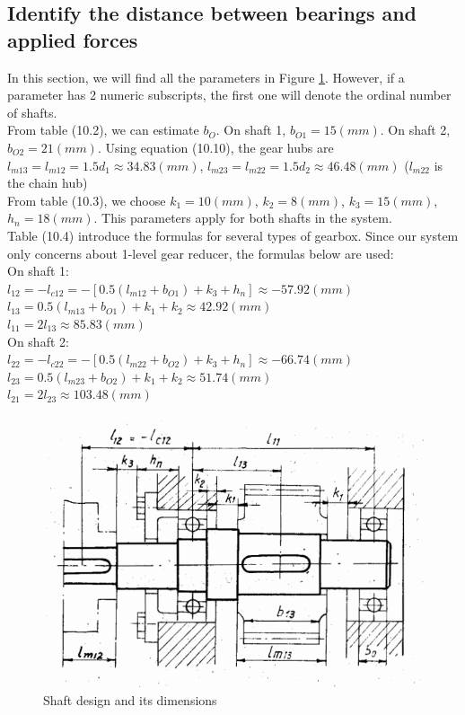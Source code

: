 \subsection{Identify the distance between bearings and applied forces}
In this section, we will find all the parameters in Figure \ref{shaft}. However, if a parameter has 2 numeric subscripts, the first one will denote the ordinal number of shafts.\\
From table (10.2), we can estimate $ b_O $. On shaft 1, $ b_{O1} = 15\unit{(mm)} $. On shaft 2, $ b_{O2} = 21\unit{(mm)} $. Using equation (10.10), the gear hubs are $ l_{m13} = l_{m12} = 1.5d_1 \approx  34.83\unit{(mm)} $, $ l_{m23} = l_{m22} = 1.5d_2 \approx 46.48\unit{(mm)} $ ($ l_{m22} $ is the chain hub)\\
From table (10.3), we choose $ k_1=10\unit{(mm)}$, $ k_2=8\unit{(mm)} $, $ k_3=15\unit{(mm)} $, $ h_n=18\unit{(mm)} $. This parameters apply for both shafts in the system.\\
Table (10.4) introduce the formulas for several types of gearbox. Since our system only concerns about 1-level gear reducer, the formulas below are used:\\
On shaft 1:\\
$ l_{12} = -l_{c12} = -\left[ 0.5(l_{m12}+b_{O1})+k_3+h_n  \right] \approx -57.92\unit{(mm)} $\\
$ l_{13} = 0.5(l_{m13}+b_{O1})+k_1+k_2 \approx 42.92\unit{(mm)} $\\
$ l_{11} = 2l_{13} \approx 85.83\unit{(mm)}$\\
On shaft 2:\\
$ l_{22} = -l_{c22} = -\left[ 0.5(l_{m22}+b_{O2})+k_3+h_n \right] \approx -66.74\unit{(mm)} $\\
$ l_{23} = 0.5(l_{m23}+b_{O2})+k_1+k_2 \approx 51.74\unit{(mm)} $\\
$ l_{21} = 2l_{23} \approx 103.48\unit{(mm)}$\\

\begin{figure}[ht]
	\centering
	\includegraphics[width=120mm]{shaft1.png}
	\caption{Shaft design and its dimensions}
	\label{shaft}
\end{figure}

